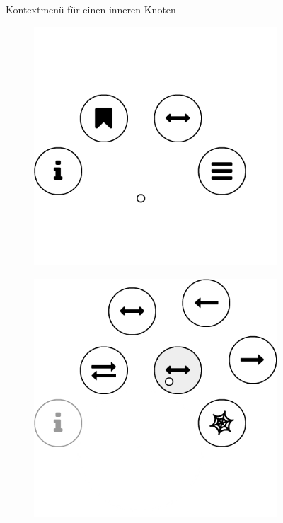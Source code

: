 \begin{figure}[htb]
\begin{subfigure}[b]{\fwidth}
     \label{fig:edge-contextmenu-connections}
  \end{subfigure}
  \caption{Kontextmenü für einen inneren Knoten} \label{fig:edge-contextmenu}
\end{figure}

\begin{figure}[htb]
  \centering
  \begin{subfigure}[b]{\fwidth}
    \centering
    \includegraphics[scale=0.45]{figures/root-contextmenu}
     \label{fig:root-contextmenu-initial}
  \end{subfigure}
  \hfill
  \begin{subfigure}[b]{\fwidth}
    \centering
    \includegraphics[scale=0.45]{figures/root-contextmenu-connections}

\end{subfigure}
\end{figure}
